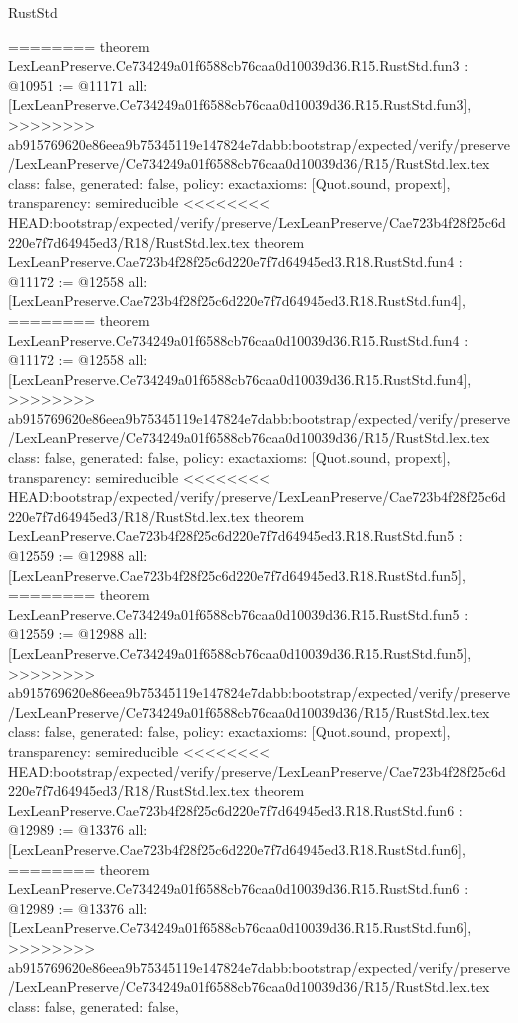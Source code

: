 \begin{lexlean}{RustStd}
\begin{coremodule}
{\begin{coremodule}
{{{{{{========
theorem LexLeanPreserve.Ce734249a01f6588cb76caa0d10039d36.R15.RustStd.fun3 : @10951 := @11171 {
  all: [LexLeanPreserve.Ce734249a01f6588cb76caa0d10039d36.R15.RustStd.fun3],
>>>>>>>> ab915769620e86eea9b75345119e147824e7dabb:bootstrap/expected/verify/preserve/LexLeanPreserve/Ce734249a01f6588cb76caa0d10039d36/R15/RustStd.lex.tex
  class: false,
  generated: false,
  policy: exact{axioms: [Quot.sound, propext]},
  transparency: semireducible
}
<<<<<<<< HEAD:bootstrap/expected/verify/preserve/LexLeanPreserve/Cae723b4f28f25c6d220e7f7d64945ed3/R18/RustStd.lex.tex
theorem LexLeanPreserve.Cae723b4f28f25c6d220e7f7d64945ed3.R18.RustStd.fun4 : @11172 := @12558 {
  all: [LexLeanPreserve.Cae723b4f28f25c6d220e7f7d64945ed3.R18.RustStd.fun4],
========
theorem LexLeanPreserve.Ce734249a01f6588cb76caa0d10039d36.R15.RustStd.fun4 : @11172 := @12558 {
  all: [LexLeanPreserve.Ce734249a01f6588cb76caa0d10039d36.R15.RustStd.fun4],
>>>>>>>> ab915769620e86eea9b75345119e147824e7dabb:bootstrap/expected/verify/preserve/LexLeanPreserve/Ce734249a01f6588cb76caa0d10039d36/R15/RustStd.lex.tex
  class: false,
  generated: false,
  policy: exact{axioms: [Quot.sound, propext]},
  transparency: semireducible
}
<<<<<<<< HEAD:bootstrap/expected/verify/preserve/LexLeanPreserve/Cae723b4f28f25c6d220e7f7d64945ed3/R18/RustStd.lex.tex
theorem LexLeanPreserve.Cae723b4f28f25c6d220e7f7d64945ed3.R18.RustStd.fun5 : @12559 := @12988 {
  all: [LexLeanPreserve.Cae723b4f28f25c6d220e7f7d64945ed3.R18.RustStd.fun5],
========
theorem LexLeanPreserve.Ce734249a01f6588cb76caa0d10039d36.R15.RustStd.fun5 : @12559 := @12988 {
  all: [LexLeanPreserve.Ce734249a01f6588cb76caa0d10039d36.R15.RustStd.fun5],
>>>>>>>> ab915769620e86eea9b75345119e147824e7dabb:bootstrap/expected/verify/preserve/LexLeanPreserve/Ce734249a01f6588cb76caa0d10039d36/R15/RustStd.lex.tex
  class: false,
  generated: false,
  policy: exact{axioms: [Quot.sound, propext]},
  transparency: semireducible
}
<<<<<<<< HEAD:bootstrap/expected/verify/preserve/LexLeanPreserve/Cae723b4f28f25c6d220e7f7d64945ed3/R18/RustStd.lex.tex
theorem LexLeanPreserve.Cae723b4f28f25c6d220e7f7d64945ed3.R18.RustStd.fun6 : @12989 := @13376 {
  all: [LexLeanPreserve.Cae723b4f28f25c6d220e7f7d64945ed3.R18.RustStd.fun6],
========
theorem LexLeanPreserve.Ce734249a01f6588cb76caa0d10039d36.R15.RustStd.fun6 : @12989 := @13376 {
  all: [LexLeanPreserve.Ce734249a01f6588cb76caa0d10039d36.R15.RustStd.fun6],
>>>>>>>> ab915769620e86eea9b75345119e147824e7dabb:bootstrap/expected/verify/preserve/LexLeanPreserve/Ce734249a01f6588cb76caa0d10039d36/R15/RustStd.lex.tex
  class: false,
  generated: false,
}}}}}}}}}}
\end{coremodule}}
\end{coremodule}
\end{lexlean}
